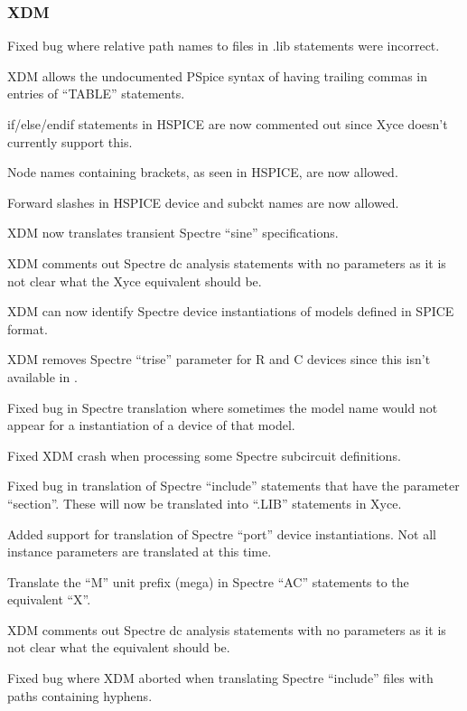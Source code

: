 \documentclass[letterpaper]{scrartcl}
\begin{document}
\subsubsection*{XDM}
\begin{XyceItemize}
    \item Fixed bug where relative path names to files in .lib statements were
        incorrect.
    \item XDM allows the undocumented PSpice syntax of having trailing
        commas in entries of ``TABLE'' statements.
    \item if/else/endif statements in HSPICE are now commented out
      since Xyce doesn't currently support this.
    \item Node names containing brackets, as seen in HSPICE, are
      now allowed.
    \item Forward slashes in HSPICE device and subckt names are now
      allowed.
    \item XDM now translates transient Spectre ``sine'' specifications.
    \item XDM comments out Spectre dc analysis statements with no parameters
        as it is not clear what the Xyce equivalent should be.
    \item XDM can now identify Spectre device instantiations of models
        defined in SPICE format.
    \item XDM removes Spectre ``trise'' parameter for R and C devices
        since this isn't available in \Xyce{}.
    \item Fixed bug in Spectre translation where sometimes the model name
        would not appear for a instantiation of a device of that model.
    \item Fixed XDM crash when processing some Spectre subcircuit
        definitions.
    \item Fixed bug in translation of Spectre ``include'' statements that have
        the parameter ``section''. These will now be translated into ``.LIB''
        statements in Xyce.
    \item Added support for translation of Spectre ``port'' device
        instantiations. Not all instance parameters are translated at this
        time.
    \item Translate the ``M'' unit prefix (mega) in Spectre ``AC'' statements
        to the \Xyce{} equivalent ``X''.
    \item XDM comments out Spectre dc analysis statements with no
        parameters as it is not clear what the \Xyce{} equivalent should be.
    \item Fixed bug where XDM aborted when translating Spectre ``include''
        files with paths containing hyphens.
\end{XyceItemize}
\end{document}
